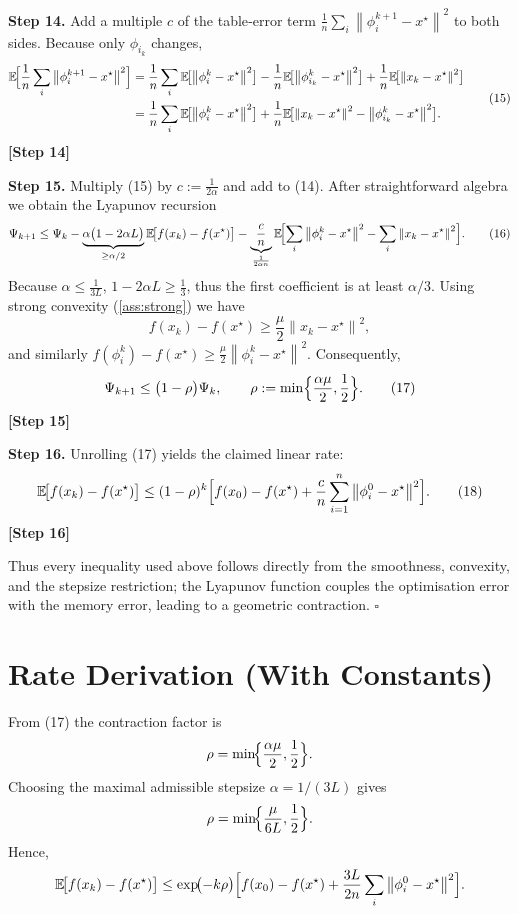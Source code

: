 \documentclass{article}
\newcommand{\E}{\mathbb{E}}
\newcommand{\norm}[1]{\left\|#1\right\|}
\begin{document}
\noindent\textbf{Step 14.}  Add a multiple $c$ of the table‑error term
$\frac{1}{n}\sum_i\norm{\phi_i^{k+1}-x^\star}^2$ to both sides.
Because only $\phi_{i_k}$ changes,
\[
\begin{aligned}
\E\!\Bigl[\frac{1}{n}\sum_i\norm{\phi_i^{k+1}-x^\star}^2\Bigr]
&= \frac{1}{n}\sum_i\E\!\bigl[\norm{\phi_i^{k}-x^\star}^2\bigr]
   -\frac{1}{n}\E\!\bigl[\norm{\phi_{i_k}^{k}-x^\star}^2\bigr]
   +\frac{1}{n}\E\!\bigl[\norm{x_k-x^\star}^2\bigr]\\
&= \frac{1}{n}\sum_i\E\!\bigl[\norm{\phi_i^{k}-x^\star}^2\bigr]
   +\frac{1}{n}\E\!\bigl[\norm{x_k-x^\star}^2-\norm{\phi_{i_k}^{k}-x^\star}^2\bigr].
\end{aligned}
\tag{15}
\]
\textbf{[Step 14]}

\noindent\textbf{Step 15.}  Multiply (15) by $c:=\frac{1}{2\alpha}$ and add to (14).  
After straightforward algebra we obtain the Lyapunov recursion
\[
\Psi_{k+1}\le\Psi_k-
\underbrace{\alpha\bigl(1-2\alpha L\bigr)}_{\ge \alpha/2}
\E\!\bigl[f(x_k)-f(x^\star)\bigr]
-\underbrace{\frac{c}{n}}_{\frac{1}{2\alpha n}}
\E\!\Bigl[\sum_i\norm{\phi_i^{k}-x^\star}^2-
\sum_i\norm{x_k-x^\star}^2\Bigr]. \tag{16}
\]
Because $\alpha\le\frac{1}{3L}$, $1-2\alpha L\ge\frac{1}{3}$, thus the first coefficient is at least $\alpha/3$.  
Using strong convexity (\ref{ass:strong}) we have
\[
f(x_k)-f(x^\star)\ge\frac{\mu}{2}\norm{x_k-x^\star}^2,
\]
and similarly $f(\phi_i^k)-f(x^\star)\ge\frac{\mu}{2}\norm{\phi_i^k-x^\star}^2$.  
Consequently,
\[
\Psi_{k+1}\le\bigl(1-\rho\bigr)\Psi_k,
\qquad
\rho:=\min\Bigl\{\frac{\alpha\mu}{2},\frac{1}{2}\Bigr\}. \tag{17}
\]
\textbf{[Step 15]}

\noindent\textbf{Step 16.}  Unrolling (17) yields the claimed linear rate:
\[
\E\!\bigl[f(x_k)-f(x^\star)\bigr]\le(1-\rho)^k
\Bigl[f(x_0)-f(x^\star)+\frac{c}{n}\sum_{i=1}^{n}\norm{\phi_i^{0}-x^\star}^2\Bigr].
\tag{18}
\]
\textbf{[Step 16]}

Thus every inequality used above follows directly from the smoothness, convexity, and the stepsize restriction; the Lyapunov function couples the optimisation error with the memory error, leading to a geometric contraction. \(\square\)

\section*{Rate Derivation (With Constants)}
From (17) the contraction factor is
\[
\rho = \min\!\Bigl\{\frac{\alpha\mu}{2},\frac{1}{2}\Bigr\}.
\]
Choosing the maximal admissible stepsize $\alpha=1/(3L)$ gives
\[
\rho = \min\!\Bigl\{\frac{\mu}{6L},\frac{1}{2}\Bigr\}.
\]
Hence,
\[
\E\!\bigl[f(x_k)-f(x^\star)\bigr]\le
\exp\!\bigl(-k\rho\bigr)
\Bigl[f(x_0)-f(x^\star)+\frac{3L}{2n}\sum_i\norm{\phi_i^{0}-x^\star}^2\Bigr].
\]
\end{document}
